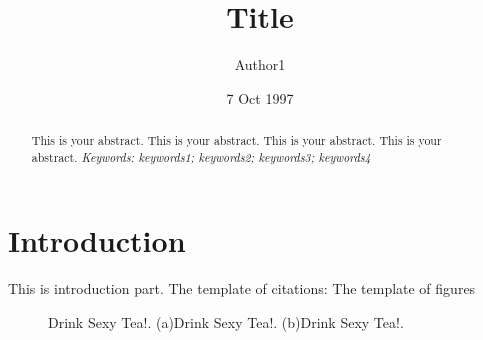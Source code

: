 \documentclass[a4paper]{article}
\title{Title}
\author[a]{Author1}
\affil[a]{School of 100, 100University \authorcr author1@mail.100.edu.cn}
\date{7 Oct 1997}
\begin{document}
\maketitle
\begin{abstract}
    \noindent This is your abstract. This is your abstract. This is your abstract. This is your abstract.
    \newline
    \newline
    \emph{Keywords: keywords1; keywords2; keywords3; keywords4}
    
\end{abstract}


\section{Introduction}
This is introduction part.
\newline
\newline
The template of citations: \cite{ref1}
\newline
\newline
The template of figures
\begin{figure}[H]
    \centering
    \caption{Drink Sexy Tea!. (a)Drink Sexy Tea!. (b)Drink Sexy Tea!.}
    \label{fig:1}
\end{figure}
\end{document}
